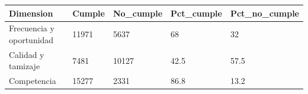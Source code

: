 \begin{tabular}{lllll}
  \toprule
Dimension & Cumple & No\_cumple & Pct\_cumple & Pct\_no\_cumple \\ 
  \midrule
Frecuencia y oportunidad & 11971 & 5637 & 68 & 32 \\ 
  Calidad y tamizaje & 7481 & 10127 & 42.5 & 57.5 \\ 
  Competencia & 15277 & 2331 & 86.8 & 13.2 \\ 
   \bottomrule
\end{tabular}
